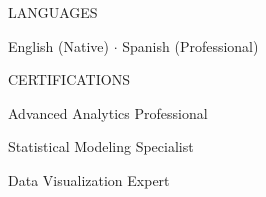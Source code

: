 \documentclass[10pt,letterpaper]{article}
\begin{document}
\begin{minipage}[t]{0.295\textwidth}
\vspace{2pt}

\begin{sidebarsection}
LANGUAGES
\end{sidebarsection}

{\fontsize{7.5pt}{9pt}\selectfont\sffamily\color{darktext}
English (Native) $\cdot$ Spanish (Professional)}

\vspace{2pt}

\begin{sidebarsection}
CERTIFICATIONS
\end{sidebarsection}

{\fontsize{7.5pt}{9pt}\selectfont\sffamily\color{darktext}
Advanced Analytics Professional\par
Statistical Modeling Specialist\par
Data Visualization Expert}

\end{minipage}%
\hspace{0.035\textwidth}%
\end{document}
